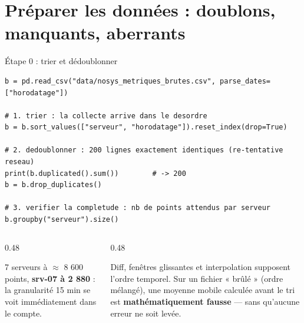 \section{Préparer les données : doublons, manquants, aberrants}

\begin{frame}[fragile]{Étape 0 : trier et dédoublonner}
\begin{codebox}
\begin{lstlisting}
b = pd.read_csv("data/nosys_metriques_brutes.csv", parse_dates=["horodatage"])

# 1. trier : la collecte arrive dans le desordre
b = b.sort_values(["serveur", "horodatage"]).reset_index(drop=True)

# 2. dedoublonner : 200 lignes exactement identiques (re-tentative reseau)
print(b.duplicated().sum())        # -> 200
b = b.drop_duplicates()

# 3. verifier la completude : nb de points attendus par serveur
b.groupby("serveur").size()
\end{lstlisting}
\end{codebox}
\begin{columns}[t]
\begin{column}{0.48\textwidth}
\begin{ebox}
7 serveurs à $\approx$ 8 600 points, \textbf{srv-07 à 2 880} : la
granularité 15 min se voit immédiatement dans le compte.
\end{ebox}
\end{column}
\begin{column}{0.48\textwidth}
\begin{wbox}
Diff, fenêtres glissantes et interpolation supposent l'ordre
temporel. Sur un fichier « brûlé » (ordre mélangé), une moyenne
mobile calculée avant le tri est \textbf{mathématiquement fausse}
--- sans qu'aucune erreur ne soit levée.
\end{wbox}
\end{column}
\end{columns}
\end{frame}

